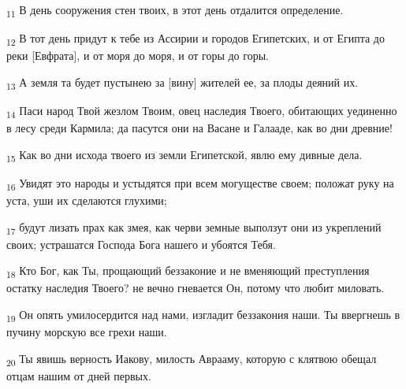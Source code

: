 \begin{tcolorbox}
\textsubscript{11} В день сооружения стен твоих, в этот день отдалится определение.
\end{tcolorbox}
\begin{tcolorbox}
\textsubscript{12} В тот день придут к тебе из Ассирии и городов Египетских, и от Египта до реки [Евфрата], и от моря до моря, и от горы до горы.
\end{tcolorbox}
\begin{tcolorbox}
\textsubscript{13} А земля та будет пустынею за [вину] жителей ее, за плоды деяний их.
\end{tcolorbox}
\begin{tcolorbox}
\textsubscript{14} Паси народ Твой жезлом Твоим, овец наследия Твоего, обитающих уединенно в лесу среди Кармила; да пасутся они на Васане и Галааде, как во дни древние!
\end{tcolorbox}
\begin{tcolorbox}
\textsubscript{15} Как во дни исхода твоего из земли Египетской, явлю ему дивные дела.
\end{tcolorbox}
\begin{tcolorbox}
\textsubscript{16} Увидят это народы и устыдятся при всем могуществе своем; положат руку на уста, уши их сделаются глухими;
\end{tcolorbox}
\begin{tcolorbox}
\textsubscript{17} будут лизать прах как змея, как черви земные выползут они из укреплений своих; устрашатся Господа Бога нашего и убоятся Тебя.
\end{tcolorbox}
\begin{tcolorbox}
\textsubscript{18} Кто Бог, как Ты, прощающий беззаконие и не вменяющий преступления остатку наследия Твоего? не вечно гневается Он, потому что любит миловать.
\end{tcolorbox}
\begin{tcolorbox}
\textsubscript{19} Он опять умилосердится над нами, изгладит беззакония наши. Ты ввергнешь в пучину морскую все грехи наши.
\end{tcolorbox}
\begin{tcolorbox}
\textsubscript{20} Ты явишь верность Иакову, милость Аврааму, которую с клятвою обещал отцам нашим от дней первых.
\end{tcolorbox}
